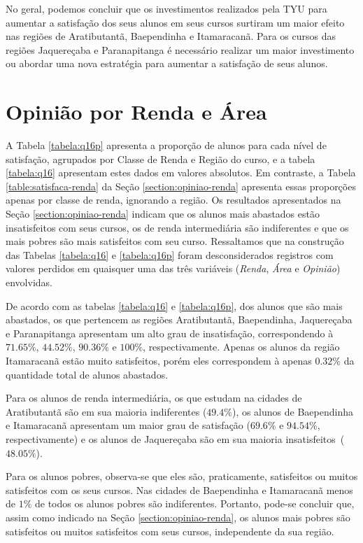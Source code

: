 \documentclass[10pt,a4paper,oneside]{article}
\newcommand{\arat}{Aratibutantã\xspace}
\newcommand{\baep}{Baependinha\xspace}
\newcommand{\itam}{Itamaracanã\xspace}
\newcommand{\jaqu}{Jaquereçaba\xspace}
\newcommand{\para}{Paranapitanga\xspace}
\begin{document}
No geral, podemos concluir que os investimentos realizados pela TYU para aumentar a satisfação dos seus alunos em seus cursos surtiram um maior efeito nas regiões de \arat, \baep e \itam. Para os cursos das regiões \jaqu e \para é necessário realizar um maior investimento ou abordar uma nova estratégia para aumentar a satisfação de seus alunos.

\FloatBarrier
\section{Opinião por Renda e Área}
\label{section:opiniao-renda-area}

A Tabela \ref{tabela:q16p} apresenta a proporção de alunos para cada nível de satisfação, agrupados por Classe de Renda e Região do curso, e a tabela \ref{tabela:q16} apresentam estes dados em valores absolutos. Em contraste, a Tabela \ref{table:satisfaca-renda} da Seção \ref{section:opiniao-renda} apresenta essas proporções apenas por classe de renda, ignorando a região. Os resultados apresentados na Seção \ref{section:opiniao-renda} indicam que os alunos mais abastados estão insatisfeitos com seus cursos, os de renda intermediária são indiferentes e que os mais pobres são mais satisfeitos com seu curso. Ressaltamos que na construção das Tabelas \ref{tabela:q16} e \ref{tabela:q16p} foram desconsiderados registros com valores perdidos em quaisquer uma das três variáveis (\textit{Renda}, \textit{Área} e \textit{Opinião}) envolvidas. 




De acordo com as tabelas \ref{tabela:q16} e \ref{tabela:q16p}, dos alunos que são mais abastados, os que pertencem as regiões \arat, \baep, \jaqu e \para apresentam um alto grau de insatisfação, correspondendo à $71.65\%$, $44.52\%$, $90.36\%$ e $100\%$, respectivamente. Apenas os alunos da região \itam estão muito satisfeitos, porém eles correspondem à apenas $0.32\%$ da quantidade total de alunos abastados.

Para os alunos de renda intermediária, os que estudam na cidades de \arat são em sua maioria indiferentes ($49.4\%$), os alunos de \baep e \itam apresentam um maior grau de satisfação ($69.6\%$ e $94.54\%$, respectivamente) e os alunos de \jaqu são em sua maioria insatisfeitos~($48.05\%$).

Para os alunos pobres, observa-se que eles são, praticamente, satisfeitos ou muitos satisfeitos com os seus cursos. Nas cidades de \baep e \itam menos de $1\%$ de todos os alunos pobres são indiferentes. Portanto, pode-se concluir que, assim como indicado na Seção \ref{section:opiniao-renda}, os alunos mais pobres são satisfeitos ou muitos satisfeitos com seus cursos, independente da sua região. 
\end{document}
